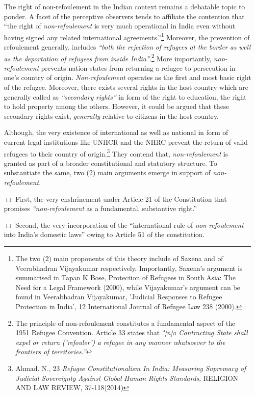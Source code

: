 \begin{multicols}{2}
\noi
The right of non-refoulement in the Indian context remains a debatable topic to ponder. A
facet of the perceptive observers tends to affiliate the contention that “the right of \textit{non-refoulement} is very much operational in India even without having signed any related international agreements.”\footnote{The two (2) main proponents of this theory include of Saxena and of Veerabhadran Vijayakumar respectively. Importantly, Saxena's argument is summarised in Tapan K Bose, Protection of Refugees in South Asia: The Need for a Legal Framework (2000), while Vijayakumar's argument can be found in Veerabhadran Vijayakumar, 'Judicial Responses to Refugee Protection in India', 12 International Journal of Refugee Law 238 (2000).}  Moreover, the prevention of refoulement generally, includes \textit{“both the rejection of refugees at the border as well as the deportation of refugees from inside India”}.\footnote{The principle of non-refoulement constitutes a fundamental aspect of the 1951 Refugee
Convention. Article 33 states that \textit{"[n]o Contracting State shall expel or return ('refouler') a refugee in any manner whatsoever to the frontiers of territories.”}} More importantly, \textit{non-refoulement} prevents nation-states from returning a refugee
to persecution in one’s country of origin. \textit{Non-refoulement} operates as the first and most basic
right of the refugee. Moreover, there exists several rights in the host country which are
generally called as \textit{“secondary rights”} in form of the right to education, the right to hold
property among the others. However, it could be argued that these secondary rights exist,
\textit{generally} relative to citizens in the host country.

\noi
Although, the very existence of international as well as national in form of current legal
institutions like UNHCR and the NHRC prevent the return of valid refugees to their country
of origin.\footnote{Ahmad. N., 23 \textit{Refugee Constitutionalism In India: Measuring Supremacy of Judicial Sovereignty Against Global Human Rights Standards,} RELIGION AND LAW REVIEW, 37-118(2014)} They contend that, \textit{non-refoulement} is granted as part of a broader constitutional
and statutory structure. To substantiate the same, two (2) main arguments emerge in support
of \textit{non-refoulement.}

\noi
$\Box$ First, the very enshrinement under Article 21 of the Constitution that promises \textit{“non-refoulement} as a fundamental, substantive right.”

\noi
$\Box$ Second, the very incorporation of the “international rule of \textit{non-refoulement} into India's
domestic laws” owing to Article 51 of the constitution.


\end{multicols}
